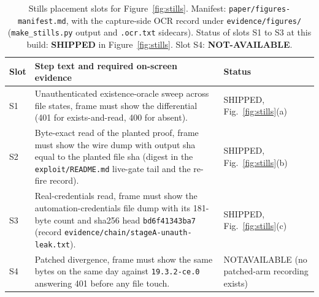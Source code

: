 \documentclass[journal]{IEEEtran}
\begin{document}
\begin{table}[t]
\caption{Stills placement slots for Figure~\ref{fig:stills}.
Manifest: \texttt{paper/figures-manifest.md}, with the capture-side OCR record
under \texttt{evidence/figures/} (\texttt{make\_stills.py} output and
\texttt{.ocr.txt} sidecars). Status of slots S1 to S3 at this build:
\textbf{SHIPPED} in Figure~\ref{fig:stills}. Slot S4: \textbf{NOT-AVAILABLE}.}
\centering\footnotesize
\begin{tabular}{p{0.5cm}p{5.45cm}p{1.5cm}}
\toprule
Slot & Step text and required on-screen evidence & Status \\
\midrule
S1 & Unauthenticated existence-oracle sweep across file states, frame must
show the differential (401 for exists-and-read, 400 for absent). & SHIPPED,
Fig.~\ref{fig:stills}(a) \\
S2 & Byte-exact read of the planted proof, frame must show the wire dump with
output sha equal to the planted file sha (digest in the
\texttt{exploit/README.md} live-gate tail and the re-fire record). & SHIPPED,
Fig.~\ref{fig:stills}(b) \\
S3 & Real-credentials read, frame must show the automation-credentials file
dump with its 181-byte count and sha256 head \texttt{bd6f41343ba7}
(record \texttt{evidence/chain/stageA-unauth-leak.txt}). & SHIPPED,
Fig.~\ref{fig:stills}(c) \\
S4 & Patched divergence, frame must show the same bytes on the same day
against \texttt{19.3.2-ce.0} answering 401 before any file touch. &
NOT\discretionary{-}{}{-}AVAILABLE (no patched-arm recording exists) \\
\bottomrule
\end{tabular}
\label{tab:stills}
\end{table}
\end{document}
